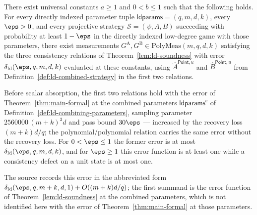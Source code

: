 \begin{proposition}
	\label{prop:ld-simultaneous-general-k}
	\leanok
	There exist universal constants $a \ge 1$ and $0 < b \le 1$ such that the
	following holds.  For every directly indexed parameter tuple
	$\mathsf{ldparams} = (q,m,d,k)$, every $\eps > 0$, and every projective
	strategy $\mathcal S = (\psi, A, B)$ succeeding with probability at least
	$1 - \eps$ in the directly indexed low-degree game with those parameters,
	there exist measurements $G^{\mathrm A}, G^{\mathrm B} \in
	\mathrm{PolyMeas}(m,q,d,k)$ satisfying the three consistency relations of
	Theorem~\ref{lem:ld-soundness} with error
	$\delta_{\mathrm{ld}}(\eps,q,m,d,k)$ evaluated at these constants, using
	$\widehat A^{\mathsf{Point},u}$ and $\widehat B^{\mathsf{Point},u}$ from
	Definition~\ref{def:ld-combined-strategy} in the first two relations.

	Before scalar absorption, the first two relations hold with the error of
	Theorem~\ref{thm:main-formal} at the combined parameters
	$\mathsf{ldparams}^{\mathrm c}$ of
	Definition~\ref{def:ld-combining-parameters}, sampling parameter
	$2560000\,(m+k)^{3}d$ and pass bound $30\eps$ --- increased by the recovery
	loss $(m+k)d/q$; the polynomial/polynomial relation carries the same error
	without the recovery loss.  For $0 < \eps \le 1$ the former error is at most
	$\delta_{\mathrm{ld}}(\eps,q,m,d,k)$, and for $\eps \ge 1$ this error
	function is at least one while a consistency defect on a unit state is at
	most one.

	The source records this error in the abbreviated form
	$\delta_{\mathrm{ld}}(\eps, q, m+k, d, 1) + O((m+k)d/q)$; the first summand
	is the error function of Theorem~\ref{lem:ld-soundness} at the combined
	parameters, which is not identified here with the error of
	Theorem~\ref{thm:main-formal} at those parameters.
\end{proposition}
